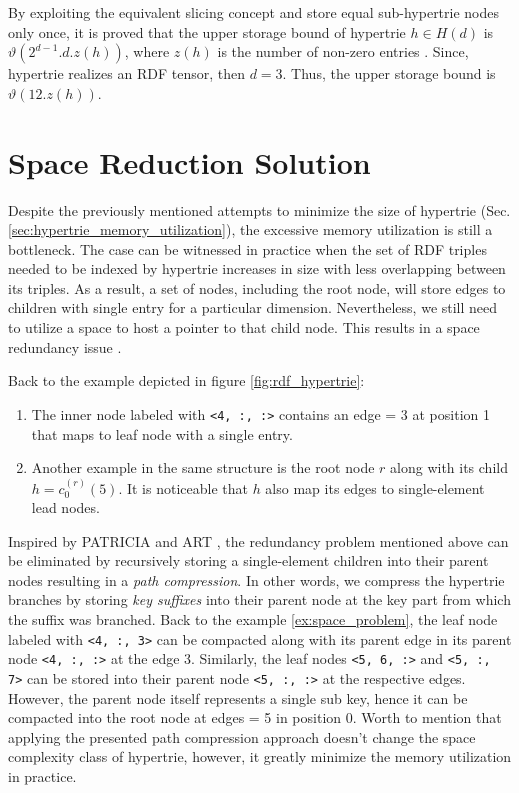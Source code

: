 By exploiting the equivalent slicing concept and store equal sub-hypertrie nodes only once, it is proved that the upper storage bound of hypertrie $h \in H(d)$ is $\vartheta(2^{d-1}. d . z(h))$, where $z(h)$ is the number of non-zero entries \cite{tentris2020}. Since, hypertrie realizes an RDF tensor, then $d=3$. Thus, the upper storage bound is $\vartheta(12 . z(h))$.
\vspace{0.5cm}

\section{Space Reduction Solution}
Despite the previously mentioned attempts to minimize the size of hypertrie (Sec. \ref{sec:hypertrie_memory_utilization}), the excessive memory utilization is still a bottleneck. The case can be witnessed in practice when the set of RDF triples needed to be indexed by hypertrie increases in size with less overlapping between its triples. As a result, a set of nodes, including the root node, will store edges to children with single entry for a particular dimension. Nevertheless, we still need to utilize a space to host a pointer to that child node. This results in a space redundancy issue \cite{PATRICIA}. 

\begin{example}
\label{ex:space_problem}
Back to the example depicted in figure \ref{fig:rdf_hypertrie}:
\begin{enumerate}
	\item The inner node labeled with \verb|<4, :, :>| contains an edge = 3 at position 1 that maps to leaf node with a single entry. 
	\item Another example in the same structure is the root node $r$ along with its child $h = c_0^{(r)}(5)$. It is noticeable that  $h$ also map its edges to single-element lead nodes.
\end{enumerate}

\end{example}

Inspired by PATRICIA \cite{PATRICIA} and ART \cite{ART}, the redundancy problem mentioned above can be eliminated by recursively storing a single-element children into their parent nodes resulting in a \textit{path compression}. In other words, we compress the hypertrie branches by storing \textit{key suffixes} into their parent node at the key part from which the suffix was branched. Back to the example \ref{ex:space_problem}, the leaf node labeled with \verb|<4, :, 3>| can be compacted along with its parent edge in its parent node \verb|<4, :, :>| at the edge 3. Similarly, the leaf nodes \verb|<5, 6, :>| and \verb|<5, :, 7>| can be stored into their parent node \verb|<5, :, :>| at the respective edges. However, the parent node itself represents a single sub key, hence it can be compacted into the root node at edges = 5 in position 0. Worth to mention that applying the presented path compression approach doesn't change the space complexity class of hypertrie, however, it greatly minimize the memory utilization in practice.\\

